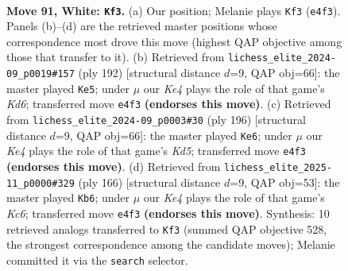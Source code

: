 \documentclass[11pt]{article}
\begin{document}
\clearpage

\begin{figure}[p]\centering
\begin{subfigure}{0.46\textwidth}\centering
\resizebox{\linewidth}{!}{%
\newchessgame
\chessboard[
  setfen={R7/5b2/1P1k4/6R1/4K2r/8/8/8 w - - 1 91},
  showmover=false,
  pgfstyle=straightmove, color=movearrow, markmove={e4-f3}
]}
\caption{}
\end{subfigure}\hfill
\begin{subfigure}{0.46\textwidth}\centering
\resizebox{\linewidth}{!}{%
\newchessgame
\chessboard[
  setfen={1R6/8/3K2r1/k7/8/8/2R5/8 w - - 13 97},
  showmover=false,
  pgfstyle=straightmove, color=movearrow, markmove={d6-e5}
]}
\caption{}
\end{subfigure}
\\[4pt]
\begin{subfigure}{0.46\textwidth}\centering
\resizebox{\linewidth}{!}{%
\newchessgame
\chessboard[
  setfen={k7/2P5/8/3K2r1/8/8/8/1R6 w - - 7 99},
  showmover=false,
  pgfstyle=straightmove, color=movearrow, markmove={d5-e6}
]}
\caption{}
\end{subfigure}\hfill
\begin{subfigure}{0.46\textwidth}\centering
\resizebox{\linewidth}{!}{%
\newchessgame
\chessboard[
  setfen={8/4k3/P1K5/8/8/8/2r5/3R4 w - - 15 84},
  showmover=false,
  pgfstyle=straightmove, color=movearrow, markmove={c6-b6}
]}
\caption{}
\end{subfigure}
\caption{\textbf{Move 91, White: \texttt{Kf3}.} (a) Our position; Melanie plays \texttt{Kf3} (\texttt{e4f3}). Panels (b)--(d) are the retrieved master positions whose correspondence most drove this move (highest QAP objective among those that transfer to it). (b) Retrieved from \texttt{lichess\_elite\_2024-09\_p0019\#157} (ply 192) [structural distance $d$=9, QAP obj=66]: the master played \texttt{Ke5}; under $\mu$ our \emph{Ke4} plays the role of that game's \emph{Kd6}; transferred move \texttt{e4f3} \textbf{(endorses this move)}. (c) Retrieved from \texttt{lichess\_elite\_2024-09\_p0003\#30} (ply 196) [structural distance $d$=9, QAP obj=66]: the master played \texttt{Ke6}; under $\mu$ our \emph{Ke4} plays the role of that game's \emph{Kd5}; transferred move \texttt{e4f3} \textbf{(endorses this move)}. (d) Retrieved from \texttt{lichess\_elite\_2025-11\_p0000\#329} (ply 166) [structural distance $d$=9, QAP obj=53]: the master played \texttt{Kb6}; under $\mu$ our \emph{Ke4} plays the role of that game's \emph{Kc6}; transferred move \texttt{e4f3} \textbf{(endorses this move)}. Synthesis: 10 retrieved analogs transferred to \texttt{Kf3} (summed QAP objective 528, the strongest correspondence among the candidate moves); Melanie committed it via the \texttt{search} selector.}
\label{fig:thought-m180}
\end{figure}
\end{document}
